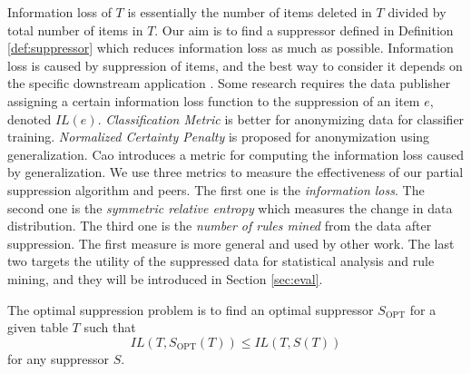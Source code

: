 Information loss of $T$ is essentially the number of items deleted in $T$ divided by total number of items in $T$.
Our aim is to find a suppressor defined in Definition \ref{def:suppressor} which reduces information loss as much as possible.
Information loss is caused by suppression of items, and the best way to consider it depends on the specific downstream application \cite{Xu:2008:ATD}.
Some research \cite{Xu:2008:ATD} requires the data publisher assigning
a certain information loss function to
the suppression of an item $e$, denoted $IL(e)$.
\emph{Classification Metric} \cite{Iyengar:2002:TDS} is better for anonymizing data for classifier training.
\emph{Normalized Certainty Penalty} \cite{Xu:2006:UAU} is proposed for anonymization using generalization.
Cao \etal \cite{Cao:2010:rho} introduces a metric for computing the information loss caused by generalization.
We use three metrics to measure
the effectiveness of our partial suppression algorithm and peers.
The first one is the \emph{information loss}.
The second one is the \emph{symmetric relative entropy} which measures the
change in data distribution.
The third one is the \emph{number of rules mined} from the data
after suppression. The first measure is more general and used by other work.
The last two targets the utility of the suppressed data for statistical analysis
and rule mining, and they will be introduced in Section \ref{sec:eval}.

\begin{definition}
\label{def:osp}
The optimal suppression problem is to find an optimal suppressor $S_\text{OPT}$ for a given table $T$ such that
\[ IL(T,S_\text{OPT}(T))\leq IL(T,S(T)) \] for any suppressor $S$.
\end{definition}

